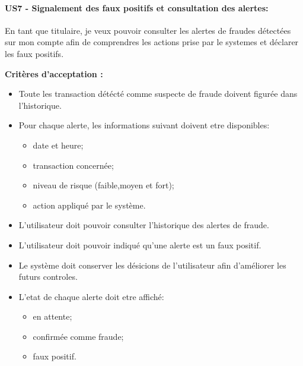 \hypertarget{us7---signalement-des-faux-positifs-et-consultation-des-alertes}{%
\paragraph{US7 - Signalement des faux positifs et consultation des
alertes:}\label{us7---signalement-des-faux-positifs-et-consultation-des-alertes}}

En tant que titulaire, je veux pouvoir consulter les alertes de fraudes
détectées sur mon compte afin de comprendres les actions prise par le
systemes et déclarer les faux positifs.

\textbf{Critères d'acceptation :}

\begin{itemize}
\tightlist
\item
  Toute les transaction détécté comme suspecte de fraude doivent figurée
  dans l'historique.
\item
  Pour chaque alerte, les informations suivant doivent etre disponibles:

  \begin{itemize}
  \tightlist
  \item
    date et heure;
  \item
    transaction concernée;
  \item
    niveau de risque (faible,moyen et fort);
  \item
    action appliqué par le système.
  \end{itemize}
\item
  L'utilisateur doit pouvoir consulter l'historique des alertes de
  fraude.
\item
  L'utilisateur doit pouvoir indiqué qu'une alerte est un faux positif.
\item
  Le système doit conserver les désicions de l'utilisateur afin
  d'améliorer les futurs controles.
\item
  L'etat de chaque alerte doit etre affiché:

  \begin{itemize}
  \tightlist
  \item
    en attente;
  \item
    confirmée comme fraude;
  \item
    faux positif.
  \end{itemize}
\end{itemize}
